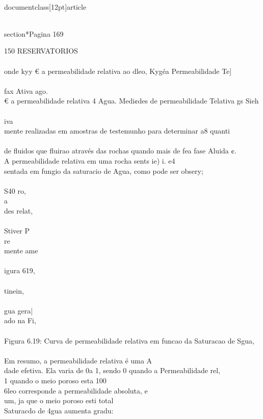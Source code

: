 \\documentclass[12pt]{article}
\begin{document}
\\section*{Pagina 169}

150 RESERVATORIOS\\
\\
onde kyy € a permeabilidade relativa ao dleo, Kygéa Permeabilidade Te]\\
\\
fax Ativa ago.\\
€ a permeabilidade relativa 4 Agua. Medi¢des de permeabilidade Telativa gs Sieh\\
\\
iva\\
mente realizadas em amostras de testemunho para determinar a8 quanti\\
\\
de fluidos que fluirao através das rochas quando mais de fea fase Aluida ¢.\\
A permeabilidade relativa em uma rocha sents ie) i. e4\\
sentada em fungio da saturacio de Agua, como pode ser obsery;\\
\\
S40 ro,\\
a\\
des relat,\\
\\
Stiver P\\
re\\
mente ame\\
\\
igura 619,\\
\\
tinein,\\
\\
gua gera|\\
ado na Fi,\\
\\
Figura 6.19: Curva de permeabilidade relativa em funcao da Saturacao de Sgua,\\
\\
Em resumo, a permeabilidade relativa é uma A\\
dade efetiva. Ela varia de 0a 1, sendo 0 quando a Permeabilidade rel,\\
1 quando o meio poroso esta 100\\%
6leo corresponde a permeabilidade absoluta, e\\
um, ja que o meio poroso esti total\\
Saturacdo de 4gua aumenta gradu:\\
\end{document}
